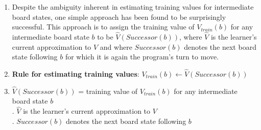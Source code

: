 \begin{enumerate}
    \item Despite the ambiguity inherent in estimating training values for intermediate board states, one simple approach has been found to be surprisingly successful.
    This approach is to assign the training value of $V_{train}(b)$ for any intermediate board state $b$ to be $\hat{V}(Successor(b))$, where $\hat{V}$ is the learner's current approximation to $V$ and where $Successor(b)$ denotes the next board state following $b$ for which it is again the program's turn to move.
    \hfill \cite{ml/book/Machine-Learning/Tom-M-Mitchell}

    \item 
    \textbf{Rule for estimating training values}: $V_{train}(b) \gets \hat{V}(Successor(b))$
    \hfill \cite{ml/book/Machine-Learning/Tom-M-Mitchell}
    
    \item 
    $\hat{V}(Successor(b))$ = training value of $V_{train}(b)$ for any intermediate board state $b$
    \\
    .\hspace{1cm} $\hat{V}$ is the learner's current approximation to $V$
    \\
    .\hspace{1cm} $Successor(b)$ denotes the next board state following $b$
    \vspace{0.3cm} \noindent
    
\end{enumerate}

































